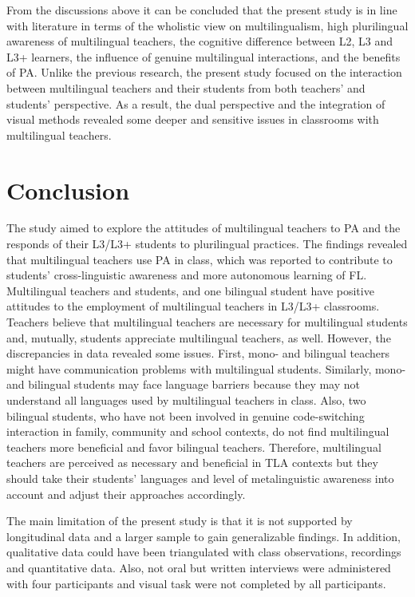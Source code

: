 \documentclass[output=paper]{../langscibook}
\begin{document}
From the discussions above it can be concluded that the present study is in line with literature in terms of the wholistic view on multilingualism, high plurilingual awareness of multilingual teachers, the cognitive difference between L2, L3 and L3+ learners, the influence of genuine multilingual interactions, and the benefits of PA. Unlike the previous research, the present study focused on the interaction between multilingual teachers and their students from both teachers’ and students’ perspective. As a result, the dual perspective and the integration of visual methods revealed some deeper and sensitive issues in classrooms with multilingual teachers.


\section{Conclusion}


The study aimed to explore the attitudes of multilingual teachers to PA and the responds of their L3/L3+ students to plurilingual practices. The findings revealed that multilingual teachers use PA in class, which was reported to contribute to students’ cross-linguistic awareness and more autonomous learning of FL. Multilingual teachers and students, and one bilingual student have positive attitudes to the employment of multilingual teachers in L3/L3+ classrooms. Teachers believe that multilingual teachers are necessary for multilingual students and, mutually, students appreciate multilingual teachers, as well. However, the discrepancies in data revealed some issues. First, mono- and bilingual teachers might have communication problems with multilingual students. Similarly, mono- and bilingual students may face language barriers because they may not understand all languages used by multilingual teachers in class. Also, two bilingual students, who have not been involved in genuine code-switching interaction in family, community and school contexts, do not find multilingual teachers more beneficial and favor bilingual teachers. Therefore, multilingual teachers are perceived as necessary and beneficial in TLA contexts but they should take their students’ languages and level of metalinguistic awareness into account and adjust their approaches accordingly.

The main limitation of the present study is that it is not supported by longitudinal data and a larger sample to gain generalizable findings. In addition, qualitative data could have been triangulated with class observations, recordings and quantitative data. Also, not oral but written interviews \citep{James2007} were administered with four participants and visual task were not completed by all participants. 
\end{document}
